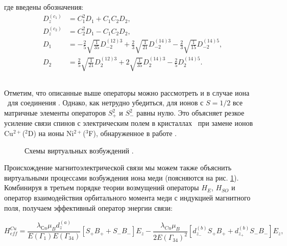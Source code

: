 где введены обозначения:
\begin{equation}
	\label{eq:NiDzC}
	\begin{aligned}
		D_{z}^{\left(c_{1}\right)} & = C_{1}^{2}D_{1}+C_{1} C_{2}D_{2}, \\
		D_{z}^{\left(c_{2}\right)} & = C_{2}^{2}D_{1}-C_{1} C_{2}D_{2},\\
		D_{1} & = -\frac{2}{5} \sqrt{\frac{1}{35}} D_{-2}^{(12) 3}+\frac{2}{3} \sqrt{\frac{1}{21}} D_{-2}^{(14) 3}-\frac{2}{3} \sqrt{\frac{1}{15}} D_{-2}^{(14) 5}, \\
		D_{2} & = \frac{2}{5} \sqrt{\frac{1}{21}} D_{2}^{(12) 3}+2 \sqrt{\frac{1}{35}} D_{2}^{(14) 3}-\frac{2}{5} D_{2}^{(14) 5}.
	\end{aligned}
\end{equation}

\subsection{\cud}\label{subsec:ch2/sec3/sub2}

Отметим, что описанные выше операторы можно рассмотреть и в случае иона \cud\ для соединения \cbo. Однако, как нетрудно убедиться, для ионов с $S=1/2$ все матричные элементы операторов $S_{+}^{2}$ и $S_{-}^{2}$ равны нулю. Это объясняет резкое усиление связи спинов с электрическим полем в кристаллах \cbo\ при замене ионов Cu$^{2+}$($^{2}$D) на ионы Ni$^{2+}$($^{3}$F), обнаруженное в работе \cite{Khanh2013}.

\begin{figure}[ht]
	\caption{Схемы виртуальных возбуждений \cud.}
	\label{fig:cu_trans}
\end{figure}

Происхождение магнитоэлектрической связи мы можем также объяснить виртуальными процессами возбуждения иона меди (поясняются на рис. \cref{fig:cu_trans}). Комбинируя в третьем порядке теории возмущений операторы $H_{E}$, $H_{SO}$ и оператор взаимодействия орбитального момента меди с индукцией магнитного поля, получаем эффективный оператор энергии связи:

\begin{equation}
	\label{eq:CuHEff}
	H_{eff}^{Cu}=\frac{\lambda_{Сu} \mu_{B} d_{z}^{(a)}}{E\left(\Gamma_{1}\right) E\left(\Gamma_{34}\right)}\left[S_{+} B_{+}+S_{-} B_{-}\right] E_{z} - \frac{\lambda_{Cu} \mu_{B} }{2 E\left(\Gamma_{34}\right)^{2}}\left[d_{z_{-}}^{(b)}S_{+} B_{+} + d_{z_{+}}^{(b)} S_{-} B_{-}\right] E_{z},
\end{equation}


